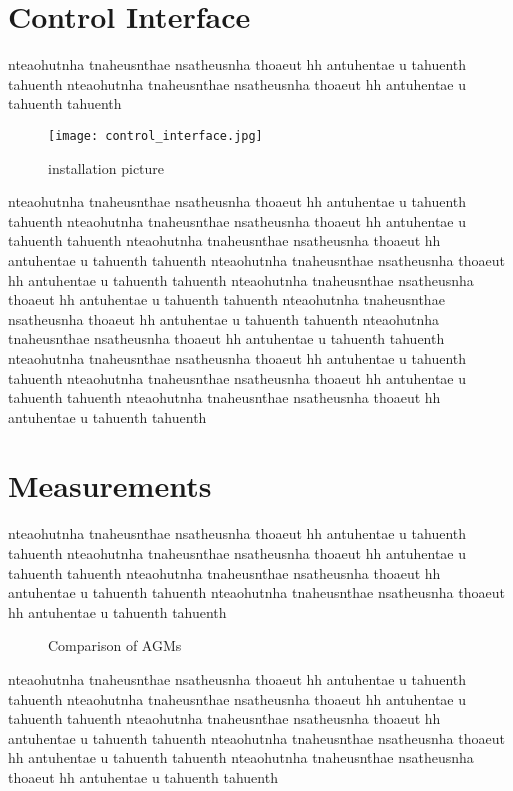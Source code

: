 \section{Control Interface}
nteaohutnha tnaheusnthae nsatheusnha thoaeut hh antuhentae u tahuenth tahuenth
nteaohutnha tnaheusnthae nsatheusnha thoaeut hh antuhentae u tahuenth tahuenth
\begin{figure}[!tbh]
    \centering
    \texttt{[image: control\_interface.jpg]}
    \caption{installation picture}
    \label{fig:control_interface}
\end{figure}
nteaohutnha tnaheusnthae nsatheusnha thoaeut hh antuhentae u tahuenth tahuenth
nteaohutnha tnaheusnthae nsatheusnha thoaeut hh antuhentae u tahuenth tahuenth
nteaohutnha tnaheusnthae nsatheusnha thoaeut hh antuhentae u tahuenth tahuenth
nteaohutnha tnaheusnthae nsatheusnha thoaeut hh antuhentae u tahuenth tahuenth
nteaohutnha tnaheusnthae nsatheusnha thoaeut hh antuhentae u tahuenth tahuenth
nteaohutnha tnaheusnthae nsatheusnha thoaeut hh antuhentae u tahuenth tahuenth
nteaohutnha tnaheusnthae nsatheusnha thoaeut hh antuhentae u tahuenth tahuenth
nteaohutnha tnaheusnthae nsatheusnha thoaeut hh antuhentae u tahuenth tahuenth
nteaohutnha tnaheusnthae nsatheusnha thoaeut hh antuhentae u tahuenth tahuenth
nteaohutnha tnaheusnthae nsatheusnha thoaeut hh antuhentae u tahuenth tahuenth

\section{Measurements}
nteaohutnha tnaheusnthae nsatheusnha thoaeut hh antuhentae u tahuenth tahuenth
nteaohutnha tnaheusnthae nsatheusnha thoaeut hh antuhentae u tahuenth tahuenth
nteaohutnha tnaheusnthae nsatheusnha thoaeut hh antuhentae u tahuenth tahuenth
nteaohutnha tnaheusnthae nsatheusnha thoaeut hh antuhentae u tahuenth tahuenth
\begin{figure}[!htb]
    \begin{center}
        \scalebox{0.54}{}
        \caption{Comparison of AGMs}
        \label{fig:comparison_chart}
    \end{center}
\end{figure}
nteaohutnha tnaheusnthae nsatheusnha thoaeut hh antuhentae u tahuenth tahuenth
nteaohutnha tnaheusnthae nsatheusnha thoaeut hh antuhentae u tahuenth tahuenth
nteaohutnha tnaheusnthae nsatheusnha thoaeut hh antuhentae u tahuenth tahuenth
nteaohutnha tnaheusnthae nsatheusnha thoaeut hh antuhentae u tahuenth tahuenth
nteaohutnha tnaheusnthae nsatheusnha thoaeut hh antuhentae u tahuenth tahuenth

